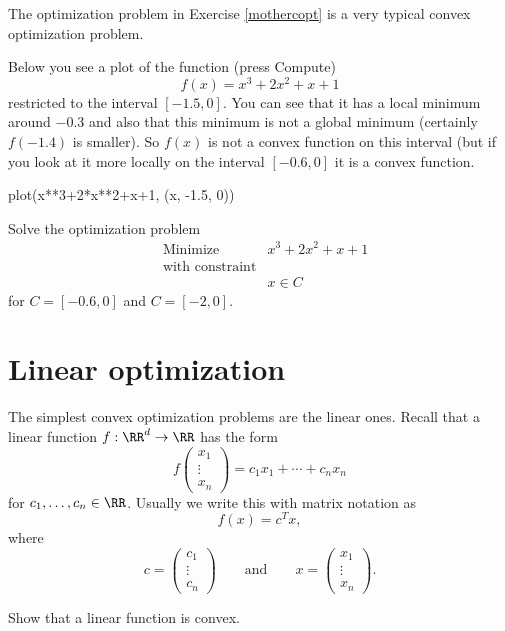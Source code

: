 \documentclass{article}
\begin{document}
    The optimization problem in Exercise \ref{mothercopt} is a very typical convex optimization
    problem.

    Below you see a plot of the function (press Compute)
    $$
    f(x) = x^3 + 2 x^2 + x + 1
    $$
    restricted
    to the interval $[-1.5, 0]$. You can see that it has a local minimum around $-0.3$ and
    also that this minimum is not a global minimum (certainly $f(-1.4)$ is smaller). So $f(x)$
    is not a convex function on this interval (but if you look at it more locally on the
    interval $[-0.6, 0]$ it is a convex function.
    
    \begin{sage}
      plot(x**3+2*x**2+x+1, (x, -1.5, 0))
    \end{sage}

    \beginshex
    Solve the optimization problem
    \begin{align*}
    &\text{Minimize} &x^3 + 2 x^2 + x + 1\\
    &\text{with constraint}\\
      &&x\in C
    \end{align*}
    for $C = [-0.6, 0]$ and $C = [-2, 0]$.
    \endshex
    
  \section{Linear optimization}

  The simplest convex optimization problems are the linear ones. Recall that a
  linear function $f: \RR^d\rightarrow \RR$ has the form
  $$
  f\begin{pmatrix} x_1 \\ \vdots \\ x_n \end{pmatrix} =
  c_1 x_1 + \cdots + c_n x_n
  $$
  for $c_1, \dots, c_n\in \RR$. Usually we write this with matrix notation as
  $$
  f(x) = c^T x,
  $$
  where
  $$
  c =
  \begin{pmatrix} c_1 \\ \vdots \\ c_n \end{pmatrix}\qquad \text{and} \qquad
  x = \begin{pmatrix} x_1 \\ \vdots \\ x_n \end{pmatrix}.
  $$

  \beginshex
  Show that a linear function is convex.
  \endshex
  
\end{document}

